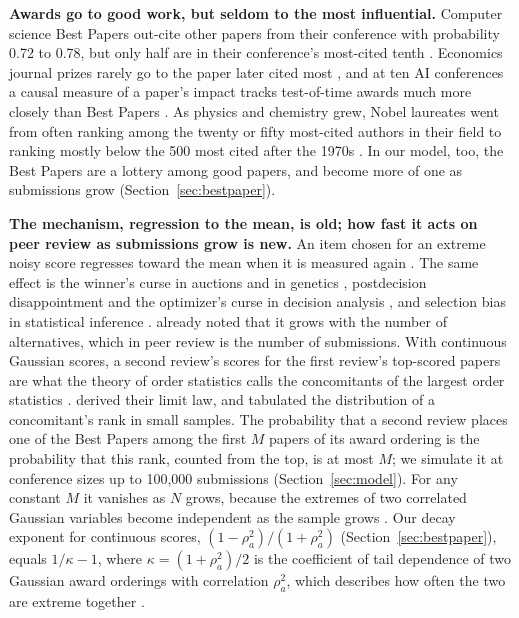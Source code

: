 \documentclass{article}
\begin{document}
\textbf{Awards go to good work, but seldom to the most influential.} Computer science Best Papers out-cite other papers from their conference with probability 0.72 to 0.78, but only half are in their conference's most-cited tenth \citep{wainer2015peer}. Economics journal prizes rarely go to the paper later cited most \citep{coupe2013peer}, and at ten AI conferences a causal measure of a paper's impact tracks test-of-time awards much more closely than Best Papers \citep{agrawal2024causalcite}. As physics and chemistry grew, Nobel laureates went from often ranking among the twenty or fifty most-cited authors in their field to ranking mostly below the 500 most cited after the 1970s \citep{gingras2010why}. In our model, too, the Best Papers are a lottery among good papers, and become more of one as submissions grow (Section~\ref{sec:bestpaper}).

\textbf{The mechanism, regression to the mean, is old; how fast it acts on peer review as submissions grow is new.} An item chosen for an extreme noisy score regresses toward the mean when it is measured again \citep{galton1886regression,kelley1927interpretation}. The same effect is the winner's curse in auctions \citep{capen1971competitive} and in genetics \citep{zollner2007overcoming}, postdecision disappointment and the optimizer's curse in decision analysis \citep{harrison1984decision,smith2006optimizer}, and selection bias in statistical inference \citep{efron2011tweedie,andrews2024inference}. \citet{harrison1984decision} already noted that it grows with the number of alternatives, which in peer review is the number of submissions. With continuous Gaussian scores, a second review's scores for the first review's top-scored papers are what the theory of order statistics calls the concomitants of the largest order statistics \citep{yeo1984selection,nagaraja1994concomitants,david2003order}. \citet{david1974asymptotic} derived their limit law, and \citet{david1977rank} tabulated the distribution of a concomitant's rank in small samples. The probability that a second review places one of the Best Papers among the first $M$ papers of its award ordering is the probability that this rank, counted from the top, is at most $M$; we simulate it at conference sizes up to 100,000 submissions (Section~\ref{sec:model}). For any constant $M$ it vanishes as $N$ grows, because the extremes of two correlated Gaussian variables become independent as the sample grows \citep{sibuya1960bivariate}. Our decay exponent for continuous scores, $(1-\rho_a^2)/(1+\rho_a^2)$ (Section~\ref{sec:bestpaper}), equals $1/\kappa-1$, where $\kappa=(1+\rho_a^2)/2$ is the coefficient of tail dependence of two Gaussian award orderings with correlation $\rho_a^2$, which describes how often the two are extreme together \citep{ledford1996near,coles1999dependence}.
\end{document}
